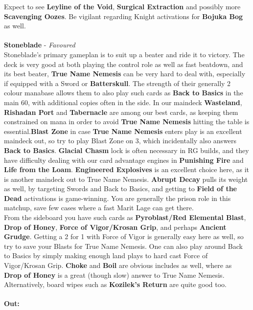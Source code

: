 \documentclass{report}
\begin{document}
Expect to see \textbf{Leyline of the Void}, \textbf{Surgical Extraction} and possibly more \textbf{Scavenging Oozes}. Be vigilant regarding Knight activations for \textbf{Bojuka Bog} as well.\\\\
\textbf{Stoneblade} - \emph{Favoured}\\
Stoneblade's primary gameplan is to suit up a beater and ride it to victory. The deck is very good at both playing the control role as well as fast beatdown, and its best beater, \textbf{True Name Nemesis} can be very hard to deal with, especially if equipped with a Sword or \textbf{Batterskull}. The strength of their generally 2 colour manabase allows them to also play such cards as \textbf{Back to Basics} in the main 60, with additional copies often in the side. In our maindeck \textbf{Wasteland}, \textbf{Rishadan Port} and \textbf{Tabernacle} are among our best cards, as keeping them constrained on mana in order to avoid \textbf{True Name Nemesis} hitting the table is essential.\textbf{Blast Zone} in case \textbf{True Name Nemesis} enters play is an excellent maindeck out, so try to play Blast Zone on 3, which incidentally also answers \textbf{Back to Basics}. \textbf{Glacial Chasm} lock is often necessary in RG builds, and they have difficulty dealing with our card advantage engines in \textbf{Punishing Fire} and \textbf{Life from the Loam}. \textbf{Engineered Explosives} is an excellent choice here, as it is another maindeck out to True Name Nemesis. \textbf{Abrupt Decay} pulls its weight as well, by targeting Swords and Back to Basics, and getting to \textbf{Field of the Dead} activations is game-winning. You are generally the prison role in this matchup, save few cases where a fast Marit Lage can get there.\\
From the sideboard you have such cards as \textbf{Pyroblast/Red Elemental Blast}, \textbf{Drop of Honey}, \textbf{Force of Vigor/Krosan Grip}, and perhaps \textbf{Ancient Grudge}. Getting a 2 for 1 with Force of Vigor is generally easy here as well, so try to save your  Blasts for True Name Nemesis. One can also play around Back to Basics by simply making enough land plays to hard cast Force of Vigor/Krosan Grip. \textbf{Choke} and \textbf{Boil} are obvious includes as well, where as \textbf{Drop of Honey} is a great (though slow) answer to True Name Nemesis. Alternatively, board wipes such as \textbf{Kozilek's Return} are quite good too.\\ \\
\textbf{Out:}\\
\end{document}
